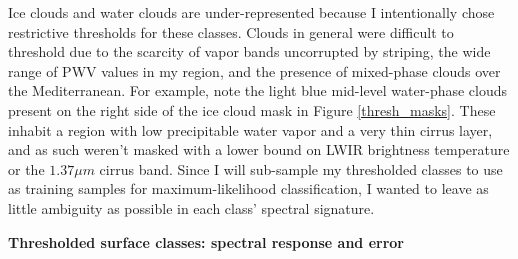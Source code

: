 \documentclass[12pt]{article}
\begin{document}
Ice clouds and water clouds are under-represented because I intentionally chose restrictive thresholds for these classes. Clouds in general were difficult to threshold due to the scarcity of vapor bands uncorrupted by striping, the wide range of PWV values in my region, and the presence of mixed-phase clouds over the Mediterranean. For example, note the light blue mid-level water-phase clouds present on the right side of the ice cloud mask in Figure \ref{thresh_masks}. These inhabit a region with low precipitable water vapor and a very thin cirrus layer, and as such weren't masked with a lower bound on LWIR brightness temperature or the $1.37\mu m$ cirrus band. Since I will sub-sample my thresholded classes to use as training samples for maximum-likelihood classification, I wanted to leave as little ambiguity as possible in each class' spectral signature.

\clearpage

\noindent
\textbf{Thresholded surface classes: spectral response and error}
\end{document}
